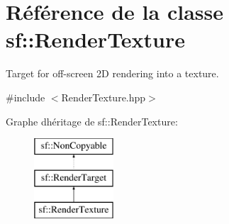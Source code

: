 \hypertarget{classsf_1_1RenderTexture}{}\section{Référence de la classe sf\+:\+:Render\+Texture}
\label{classsf_1_1RenderTexture}


Target for off-\/screen 2D rendering into a texture.  




{\ttfamily \#include $<$Render\+Texture.\+hpp$>$}

Graphe d\textquotesingle{}héritage de sf\+:\+:Render\+Texture\+:\begin{figure}[H]
\begin{center}
\leavevmode
\includegraphics[height=3.000000cm]{classsf_1_1RenderTexture}
\end{center}
\end{figure}
